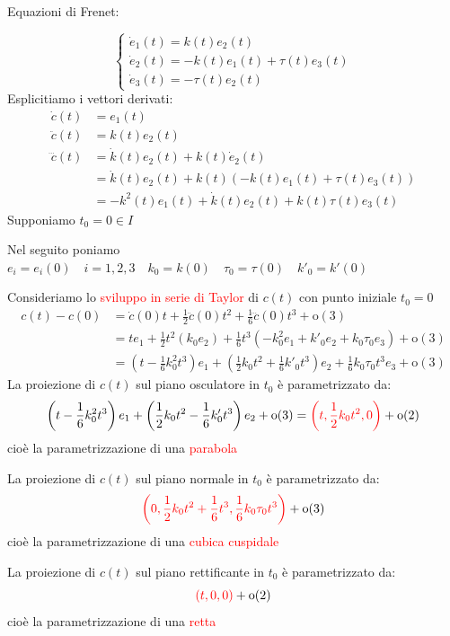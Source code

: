         Equazioni di Frenet:

        \[ \begin{cases*}
        \dot{e}_1(t) = k(t) e_2(t)\\
        \dot{e}_2(t) = -k(t) e_1(t) + \tau(t) e_3(t)\\
        \dot{e}_3(t) = -\tau(t) e_2(t)
        \end{cases*} \]
        Esplicitiamo i vettori derivati:
        \begin{align*}
        \dot{c}(t) &= e_1(t) \\
        \ddot{c}(t) &= k(t) e_2(t) \\ 
        \dddot{c}(t) &= \dot{k}(t) e_2(t) + k(t) \dot{e}_2(t) \\
        &=\dot{k}(t) e_2(t) + k(t) \left(-k(t) e_1(t) + \tau(t) e_3(t)\right) \\
        &= -k^2(t) e_1(t) + \dot{k}(t) e_2(t) + k(t) \tau(t) e_3(t)
        \end{align*}
        Supponiamo $t_0=0 \in I$ 

        Nel seguito poniamo $e_i=e_i(0) \quad i=1,2,3 \quad k_0=k(0) \quad \tau_0=\tau(0) \quad k'_0=k'(0)$

        Consideriamo lo \textcolor{red}{sviluppo in serie di Taylor} di $c(t)$ con punto iniziale $t_0=0$ 
        \begin{align*}
        c(t)-c(0) &= \dot{c}(0)t + \frac{1}{2} \ddot{c}(0) t^2 + \frac{1}{6} \dddot{c}(0) t^3 + \mathrm{o}(3) \\
        &= t e_1 + \frac{1}{2} t^2 \left(k_0 e_2 \right) + \frac{1}{6} t^3 \left(-k_0^2 e_1 + k'_0 e_2 + k_0 \tau_0 e_3\right) + \mathrm{o}(3) \\
        &= \left(t -\frac{1}{6} k_0^2 t^3 \right) e_1 + \left(\frac{1}{2} k_0 t^2 + \frac{1}{6} k'_0 t^3 \right) e_2 + \frac{1}{6} k_0 \tau_0 t^3 e_3 + \mathrm{o}(3)
        \end{align*}
        La proiezione di $c(t)$ sul piano osculatore in $t_0$ è parametrizzato da:
        \[ \left(t- \frac{1}{6} k_0^2 t^3 \right) e_1 + \left(\frac{1}{2} k_0 t^2 - \frac{1}{6} k'_0 t^3 \right) e_2 + \mathrm{o} (3) = \textcolor{red}{\left(t, \frac{1}{2}k_0 t^2, 0\right)} + \mathrm{o}(2) \]
        cioè la parametrizzazione di una \textcolor{red}{parabola}

        La proiezione di $c(t)$ sul piano normale in $t_0$ è parametrizzato da:
        \[  \textcolor{red}{\left(0, \frac{1}{2}k_0 t^2 + \frac{1}{6} t^3, \frac{1}{6} k_0 \tau_0 t^3 \right)} + \mathrm{o}(3) \]
        cioè la parametrizzazione di una \textcolor{red}{cubica cuspidale}

        La proiezione di $c(t)$ sul piano rettificante in $t_0$ è parametrizzato da:
        \[  \textcolor{red}{\left(t, 0, 0 \right)} + \mathrm{o}(2) \]
        cioè la parametrizzazione di una \textcolor{red}{retta}

